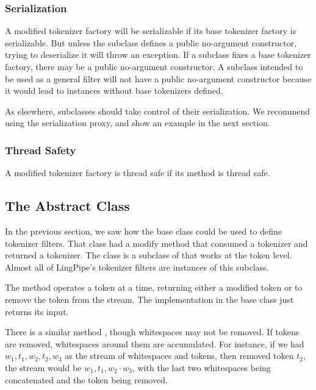 \subsubsection{Serialization}

A modified tokenizer factory will be serializable if its base
tokenizer factory is serializable.  But unless the subclass defines a
public no-argument constructor, trying to deserialize it will throw an
exception.  If a subclass fixes a base tokenizer factory, there may be
a public no-argument constructor.  A subclass intended to be used
as a general filter will not have a public no-argument constructor
because it would lead to instances without base tokenizers defined.

As elsewhere, subclasses should take control of their serialization.
We recommend using the serialization proxy, and show an example
in the next section.

\subsubsection{Thread Safety}

A modified tokenizer factory is thread safe if its 
method is thread safe.

\subsection{The  Abstract Class}

In the previous section, we saw how the 
base class could be used to define tokenizer filters.  That class
had a modify method that consumed a tokenizer and returned a tokenizer.
The class  is a subclass of
 that works at the token level.  Almost
all of LingPipe's tokenizer filters are instances of this subclass.

The method  operates a token at a time,
returning either a modified token or  to remove the token
from the stream.  The implementation in the base class just returns
its input.

There is a similar method , though
whitespaces may not be removed.  If tokens are removed, whitespaces
around them are accumulated.  For instance, if we had $w_1, t_1, w_2,
t_2, w_3$ as the stream of whitespaces and tokens, then removed token
$t_2$, the stream would be $w_1, t_1, w_2\cdot w_3$, with the last two
whitespaces being concatenated and the token being removed.

